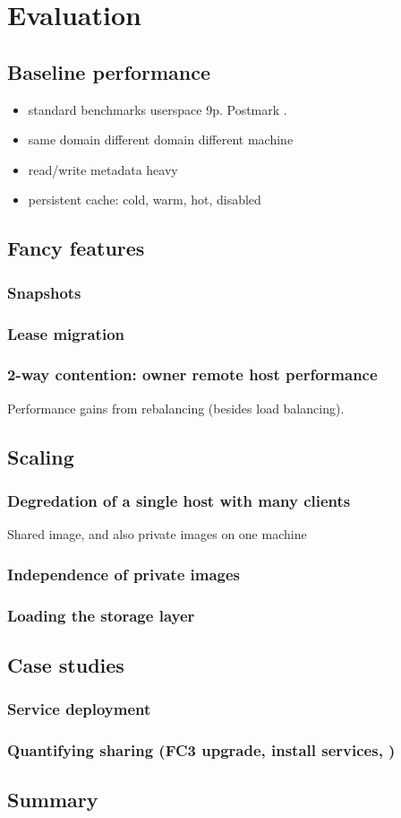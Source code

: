 \chapter{Evaluation}

\section{Baseline performance}
\begin{itemize}
\item standard benchmarks \vs userspace 9p. Postmark \cite{katcher}.
\item same domain \vs different domain \vs different machine
\item read/write \vs metadata heavy
\item persistent cache: cold, warm, hot, disabled
\end{itemize}

\section{Fancy features}
\subsection{Snapshots}
\subsection{Lease migration}
\subsection{2-way contention: owner \vs remote host performance}
Performance gains from rebalancing (besides load balancing).

\section{Scaling}
\subsection{Degredation of a single host with many clients}
Shared image, and also private images on one machine
\subsection{Independence of private images}
\subsection{Loading the storage layer}

\section{Case studies}
\subsection{Service deployment}
\subsection{Quantifying sharing (FC3 upgrade, install services, \etc)}

\section{Summary}